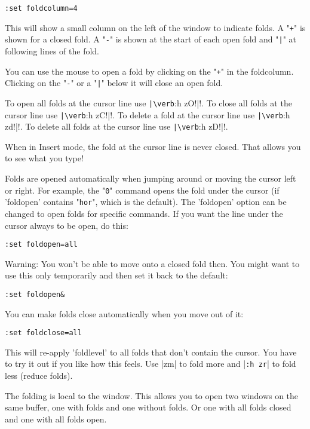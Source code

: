 \begin{Verbatim}[samepage=true]
 :set foldcolumn=4
\end{Verbatim}

This will show a small column on the left of the window to indicate folds.
A "\verb!+!" is shown for a closed fold.
A "\verb!-!" is shown at the start of each open fold and "\verb!|!" at following lines of the fold.

You can use the mouse to open a fold by clicking on the "\verb!+!" in the foldcolumn.
Clicking on the "\verb!-!" or a "\verb!|!" below it will close an open fold.

To open all folds at the cursor line use \verb!|\verb!:h zO!|!.
To close all folds at the cursor line use \verb!|\verb!:h zC!|!.
To delete a fold at the cursor line use \verb!|\verb!:h zd!|!.
To delete all folds at the cursor line use \verb!|\verb!:h zD!|!.

When in Insert mode, the fold at the cursor line is never closed.
That allows you to see what you type!

Folds are opened automatically when jumping around or moving the cursor left or right.
For example, the "\verb!0!" command opens the fold under the cursor (if 'foldopen' contains "\verb!hor!", which is the default).
The 'foldopen' option can be changed to open folds for specific commands.
If you want the line under the cursor always to be open, do this:

\begin{Verbatim}[samepage=true]
 :set foldopen=all
\end{Verbatim}

Warning: You won't be able to move onto a closed fold then.
You might want to use this only temporarily and then set it back to the default:

\begin{Verbatim}[samepage=true]
 :set foldopen&
\end{Verbatim}

You can make folds close automatically when you move out of it:

\begin{Verbatim}[samepage=true]
 :set foldclose=all
\end{Verbatim}

This will re-apply 'foldlevel' to all folds that don't contain the cursor.
You have to try it out if you like how this feels.
Use |zm| to fold more and |\verb!:h zr!| to fold less (reduce folds).

The folding is local to the window.
This allows you to open two windows on the same buffer, one with folds and one without folds.
Or one with all folds closed and one with all folds open.
